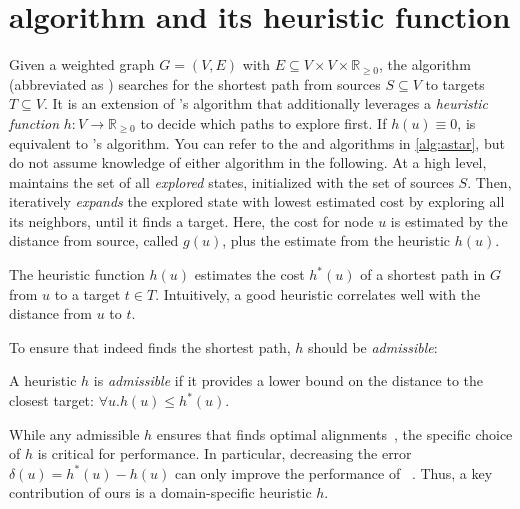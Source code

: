 \section{\A algorithm and its heuristic function} \label{sec:astar}

Given a weighted graph $G=(V,E)$ with $E \subseteq V \times V \times
\mathbb{R}_{\geq 0}$, the \A algorithm (abbreviated as \A) searches for the
shortest path from sources $S \subseteq V$ to targets $T \subseteq V$. It is an
extension of \dijkstra's algorithm that additionally leverages a \emph{heuristic
function} $h \colon V \to \mathbb{R}_{\geq 0}$ to decide which paths to explore
first.
%
If $h(u) \equiv 0$, \A is equivalent to \dijkstra's algorithm.
%
You can refer to the \A and \dijkstra algorithms in \cref{alg:astar}, but do not
assume knowledge of either algorithm in the following.
%
At a high level, \A maintains the set of all \emph{explored} states, initialized
with the set of sources $S$. Then, \A iteratively \emph{expands} the explored
state with lowest estimated cost by exploring all its neighbors, until it finds
a target. Here, the cost for node $u$ is estimated by the distance from source, called $g(u)$, plus the estimate from the heuristic $h(u)$.

The heuristic function $h(u)$ estimates the
cost $h^*(u)$ of a shortest path in $G$ from $u$ to a target $t \in T$. Intuitively, a
good heuristic correlates well with the distance from $u$ to $t$.

To ensure that \A indeed finds the shortest path, $h$ should be
\emph{admissible}:

\begin{definition} A heuristic $h$ is \emph{admissible}
    if it provides a lower bound on the distance to the closest target: $\forall
    u. h(u) \leq h^*(u)$.
\end{definition}

While any admissible $h$ ensures that \A finds optimal
alignments~\cite{dechter_generalized_1985}, the specific choice of $h$
is critical for performance. In particular, decreasing the error $\delta(u) =
h^*(u)-h(u)$ can only improve the performance of
\A~\cite{dechter_generalized_1985}. Thus, a key contribution of ours is
a domain-specific heuristic $h$.


